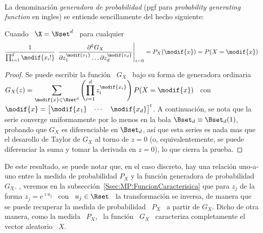 \

La denominaci\'on  {\em generadora de  probabilidad} (pgf para  {\em probability
  generating function} en ingles) se entiende sencillamente del hecho siguiente:
%
\begin{lema}
\label{Lem:MP:GeneracionProbabilidades}
%
  Cuando \ $\X = \Nset^d$ \ para cualquier \ 
  \[
  \frac1{\prod_{i=1}^d  \modif{x_i!}} \, \left.\frac{\partial^k  G_X}{\partial z_1^{\modif{x_1}}
      \ldots \partial z_d^{\modif{x_d}}}\right|_{z=0} = P_X(\modif{x}) = P(X = \modif{x})
  \]
\end{lema}
%
\begin{proof}
  Se puede escribir la funci\'on \ $G_X$ \ bajo su forma de generadora ordinaria
  \ $\displaystyle  G_X(z) =  \sum_{\modif{x} \in \Nset^d}  \left( \prod_{i=1}^d
    z_i^{\modif{x_i}}   \right)   P(X  =   \modif{x})$   \   con  \   $\modif{x}
  =  \begin{bmatrix} \modif{x_1}  &  \cdots &  \modif{x_d} \end{bmatrix}^t$.   A
  continuaci\'on, se nota que la serie converge uniformamente por lo menos en la
  bola  $\Bset_d \equiv  \Bset_d(1)$,  probando que  $G_X$  es diferenciable  en
  $\Bset_d$, as\'i  que esta series  es nada mas  que el desarollo de  Taylor de
  $G_X$ al torno de $z = 0$ (o, equivalentemente, se puede diferenciar la suma y
  tomar la derivada en $z = 0$), lo que cierra la prueba.
\end{proof}

De este resultado,  se puede notar que, en el caso  discreto, hay una relaci\'on
uno-a-uno entre  la medida  de probabilidad $P_X$  y la funci\'on  generadora de
probabilidad   $G_X$.     ,    veremos   en   la
subsecci\'on~\ref{Ssec:MP:FuncionCaracterisica} que para  $z_j$ de la forma $z_j
= e^{\imath u_j}$ \  con \ $u_j \in \Rset$ \ la  transformaci\'on se inversa, de
manera que se  puede recuperar la medida  de probabilidad \ $P_X$ \  a partir de
$G_X$. Dicho de  otra manera, como la medida  \ $P_X$, \ la funci\'on  \ $G_X$ \
caracteriza completamente el vector aleatorio \ $X$.

\

